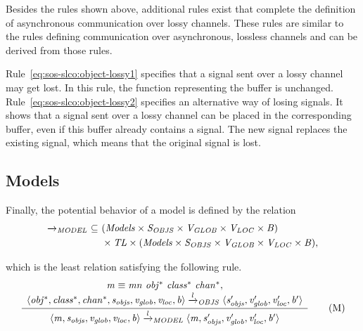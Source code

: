\noindent
Besides the rules shown above, additional rules exist that complete the definition of asynchronous communication over lossy channels.
These rules are similar to the rules defining communication over asynchronous, lossless channels and can be derived from those rules.

Rule~\eqref{eq:sos-slco:object-lossy1} specifies that a signal sent over a lossy channel may get lost.
In this rule, the function representing the buffer is unchanged.
Rule~\eqref{eq:sos-slco:object-lossy2} specifies an alternative way of losing signals.
It shows that a signal sent over a lossy channel can be placed in the corresponding buffer, even if this buffer already contains a signal.
The new signal replaces the existing signal, which means that the original signal is lost.

\subsection{Models}
Finally, the potential behavior of a model is defined by the relation
%
\begin{align*}
\xrightarrow{\it{}}_{\it{MODEL}} ~ \subseteq & ~ (\it Models \times S_{\it{OBJS}} \times V_{\it{GLOB}} \times V_{\it{LOC}} \times B) \\
 & ~ \times \it TL \times (\it Models \times S_{\it{OBJS}} \times V_{\it{GLOB}} \times V_{\it{LOC}} \times B),
\end{align*}

\noindent
which is the least relation satisfying the following rule.
%
\begin{equation*}
 \frac{ \begin{array}[c]{c} 
\it{m} \equiv \it{mn}~\it{obj^*}~\it{class^*}~\it{chan^*}, \\
\langle \it{obj^*}, \it{class^*}, \it{chan^*}, s_{\it{objs}}, v_{\it{glob}}, v_{\it{loc}}, b \rangle
\xrightarrow{\it{l}}_{\it{OBJS}}
\langle s_{\it{objs}}', v_{\it{glob}}', v_{\it{loc}}', b' \rangle
 \end{array} }{ \begin{array}[c]{c} 
\langle \it{m}, s_{\it{objs}}, v_{\it{glob}}, v_{\it{loc}}, b \rangle
\xrightarrow{\it{l}}_{\it{MODEL}}
\langle \it{m}, s_{\it{objs}}', v_{\it{glob}}', v_{\it{loc}}', b' \rangle
 \end{array} } 
\tag{M}
\label{eq:sos-slco:model}
\end{equation*} 